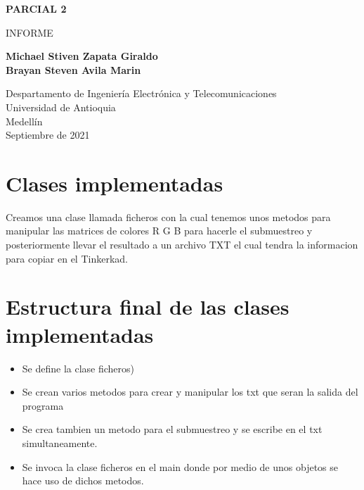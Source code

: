 \documentclass{article}
\begin{document}
\begin{titlepage}
    \begin{center}
        \vspace*{1cm}
            
        \Huge
        \textbf{PARCIAL 2}
            
        \vspace{0.5cm}
        \LARGE
        INFORME
            
        \vspace{1.5cm}
            
        \textbf{Michael Stiven Zapata Giraldo\\Brayan Steven Avila Marin}
            
        \vfill
            
        \vspace{0.8cm}
            
        \Large
        Despartamento de Ingeniería Electrónica y Telecomunicaciones\\
        Universidad de Antioquia\\
        Medellín\\
        Septiembre de 2021
            
    \end{center}
\end{titlepage}

\tableofcontents
\newpage
\section{ Clases implementadas }\label{intro}
Creamos una clase llamada ficheros con la cual tenemos unos metodos para manipular las matrices de colores R G B para hacerle el submuestreo y posteriormente llevar el resultado a un archivo TXT el cual tendra la informacion para copiar en el Tinkerkad.

\section{Estructura final de las clases implementadas}  
\begin{itemize}
\item Se define la clase ficheros)
\item Se crean varios metodos para crear y manipular los txt que seran la salida del programa
\item Se crea tambien un metodo para el submuestreo y se escribe en el txt simultaneamente.
\item Se invoca la clase ficheros en el main donde por medio de unos objetos se hace uso de dichos metodos.

\end{itemize}
\end{document}
